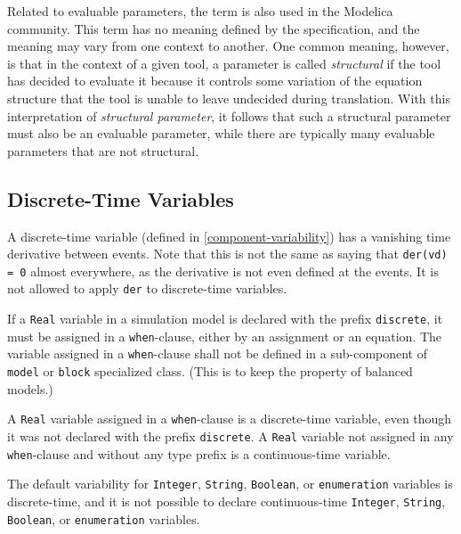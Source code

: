 \begin{nonnormative}
Related to evaluable parameters, the term  is also used in the Modelica community.
This term has no meaning defined by the specification, and the meaning may vary from one context to another.
One common meaning, however, is that in the context of a given tool, a parameter is called \emph{structural} if the tool has decided to evaluate it because it controls some variation of the equation structure that the tool is unable to leave undecided during translation.
With this interpretation of \emph{structural parameter}, it follows that such a structural parameter must also be an evaluable parameter, while there are typically many evaluable parameters that are not structural.
\end{nonnormative}


\subsection{Discrete-Time Variables}\label{discrete-time-variables}

A discrete-time variable (defined in \cref{component-variability}) has a vanishing time derivative between events.
Note that this is not the same as saying that \lstinline!der(vd) = 0! almost everywhere, as the derivative is not even defined at the events.
It is not allowed to apply \lstinline!der! to discrete-time variables.

If a \lstinline!Real! variable in a simulation model is declared with the prefix \lstinline!discrete!, it must be assigned in a \lstinline!when!-clause, either by an assignment or an equation.
The variable assigned in a \lstinline!when!-clause shall not be defined in a sub-component of \lstinline!model! or \lstinline!block! specialized class.
(This is to keep the property of balanced models.)

A \lstinline!Real! variable assigned in a \lstinline!when!-clause is a discrete-time variable, even though it was not declared with the prefix \lstinline!discrete!.
A \lstinline!Real! variable not assigned in any \lstinline!when!-clause and without any type prefix is a continuous-time variable.

The default variability for \lstinline!Integer!, \lstinline!String!, \lstinline!Boolean!, or \lstinline!enumeration! variables is discrete-time, and it is not possible to declare continuous-time \lstinline!Integer!, \lstinline!String!, \lstinline!Boolean!, or \lstinline!enumeration! variables.

